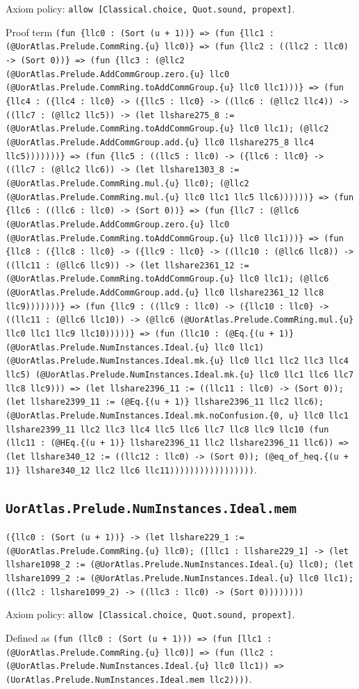 \documentclass[11pt]{article}
\begin{document}
\noindent Axiom policy: \texttt{allow [Classical.choice, Quot.sound, propext]}.\par
\noindent Proof term \texttt{(fun \{llc0 : (Sort (u + 1))\} => (fun \{llc1 : (@UorAtlas.Prelude.CommRing.\{u\} llc0)\} => (fun \{llc2 : ((llc2 : llc0) -> (Sort 0))\} => (fun \{llc3 : (@llc2 (@UorAtlas.Prelude.AddCommGroup.zero.\{u\} llc0 (@UorAtlas.Prelude.CommRing.toAddCommGroup.\{u\} llc0 llc1)))\} => (fun \{llc4 : (\{llc4 : llc0\} -> (\{llc5 : llc0\} -> ((llc6 : (@llc2 llc4)) -> ((llc7 : (@llc2 llc5)) -> (let llshare275\_8 := (@UorAtlas.Prelude.CommRing.toAddCommGroup.\{u\} llc0 llc1); (@llc2 (@UorAtlas.Prelude.AddCommGroup.add.\{u\} llc0 llshare275\_8 llc4 llc5)))))))\} => (fun \{llc5 : ((llc5 : llc0) -> (\{llc6 : llc0\} -> ((llc7 : (@llc2 llc6)) -> (let llshare1303\_8 := (@UorAtlas.Prelude.CommRing.mul.\{u\} llc0); (@llc2 (@UorAtlas.Prelude.CommRing.mul.\{u\} llc0 llc1 llc5 llc6))))))\} => (fun \{llc6 : ((llc6 : llc0) -> (Sort 0))\} => (fun \{llc7 : (@llc6 (@UorAtlas.Prelude.AddCommGroup.zero.\{u\} llc0 (@UorAtlas.Prelude.CommRing.toAddCommGroup.\{u\} llc0 llc1)))\} => (fun \{llc8 : (\{llc8 : llc0\} -> (\{llc9 : llc0\} -> ((llc10 : (@llc6 llc8)) -> ((llc11 : (@llc6 llc9)) -> (let llshare2361\_12 := (@UorAtlas.Prelude.CommRing.toAddCommGroup.\{u\} llc0 llc1); (@llc6 (@UorAtlas.Prelude.AddCommGroup.add.\{u\} llc0 llshare2361\_12 llc8 llc9)))))))\} => (fun \{llc9 : ((llc9 : llc0) -> (\{llc10 : llc0\} -> ((llc11 : (@llc6 llc10)) -> (@llc6 (@UorAtlas.Prelude.CommRing.mul.\{u\} llc0 llc1 llc9 llc10)))))\} => (fun (llc10 : (@Eq.\{(u + 1)\} (@UorAtlas.Prelude.NumInstances.Ideal.\{u\} llc0 llc1) (@UorAtlas.Prelude.NumInstances.Ideal.mk.\{u\} llc0 llc1 llc2 llc3 llc4 llc5) (@UorAtlas.Prelude.NumInstances.Ideal.mk.\{u\} llc0 llc1 llc6 llc7 llc8 llc9))) => (let llshare2396\_11 := ((llc11 : llc0) -> (Sort 0)); (let llshare2399\_11 := (@Eq.\{(u + 1)\} llshare2396\_11 llc2 llc6); (@UorAtlas.Prelude.NumInstances.Ideal.mk.noConfusion.\{0, u\} llc0 llc1 llshare2399\_11 llc2 llc3 llc4 llc5 llc6 llc7 llc8 llc9 llc10 (fun (llc11 : (@HEq.\{(u + 1)\} llshare2396\_11 llc2 llshare2396\_11 llc6)) => (let llshare340\_12 := ((llc12 : llc0) -> (Sort 0)); (@eq\_of\_heq.\{(u + 1)\} llshare340\_12 llc2 llc6 llc11)))))))))))))))))}.\par
\subsection*{\texttt{UorAtlas.Prelude.NumInstances.Ideal.mem}}
\noindent\texttt{(\{llc0 : (Sort (u + 1))\} -> (let llshare229\_1 := (@UorAtlas.Prelude.CommRing.\{u\} llc0); ([llc1 : llshare229\_1] -> (let llshare1098\_2 := (@UorAtlas.Prelude.NumInstances.Ideal.\{u\} llc0); (let llshare1099\_2 := (@UorAtlas.Prelude.NumInstances.Ideal.\{u\} llc0 llc1); ((llc2 : llshare1099\_2) -> ((llc3 : llc0) -> (Sort 0))))))))}\par
\noindent Axiom policy: \texttt{allow [Classical.choice, Quot.sound, propext]}.\par
\noindent Defined as \texttt{(fun (llc0 : (Sort (u + 1))) => (fun [llc1 : (@UorAtlas.Prelude.CommRing.\{u\} llc0)] => (fun (llc2 : (@UorAtlas.Prelude.NumInstances.Ideal.\{u\} llc0 llc1)) => (UorAtlas.Prelude.NumInstances.Ideal.mem llc2))))}.\par
\end{document}
